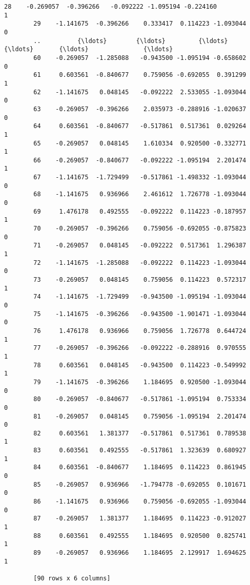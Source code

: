 \documentclass[11pt]{article}
\begin{document}
\begin{Verbatim}[commandchars=\\\{\}]
        28    -0.269057  -0.396266   -0.092222 -1.095194 -0.224160                 1
        29    -1.141675  -0.396266    0.333417  0.114223 -1.093044                 0
        ..          {\ldots}        {\ldots}         {\ldots}       {\ldots}       {\ldots}               {\ldots}
        60    -0.269057  -1.285088   -0.943500 -1.095194 -0.658602                 0
        61     0.603561  -0.840677    0.759056 -0.692055  0.391299                 1
        62    -1.141675   0.048145   -0.092222  2.533055 -1.093044                 0
        63    -0.269057  -0.396266    2.035973 -0.288916 -1.020637                 0
        64     0.603561  -0.840677   -0.517861  0.517361  0.029264                 1
        65    -0.269057   0.048145    1.610334  0.920500 -0.332771                 1
        66    -0.269057  -0.840677   -0.092222 -1.095194  2.201474                 1
        67    -1.141675  -1.729499   -0.517861 -1.498332 -1.093044                 0
        68    -1.141675   0.936966    2.461612  1.726778 -1.093044                 0
        69     1.476178   0.492555   -0.092222  0.114223 -0.187957                 1
        70    -0.269057  -0.396266    0.759056 -0.692055 -0.875823                 0
        71    -0.269057   0.048145   -0.092222  0.517361  1.296387                 1
        72    -1.141675  -1.285088   -0.092222  0.114223 -1.093044                 0
        73    -0.269057   0.048145    0.759056  0.114223  0.572317                 1
        74    -1.141675  -1.729499   -0.943500 -1.095194 -1.093044                 0
        75    -1.141675  -0.396266   -0.943500 -1.901471 -1.093044                 0
        76     1.476178   0.936966    0.759056  1.726778  0.644724                 1
        77    -0.269057  -0.396266   -0.092222 -0.288916  0.970555                 1
        78     0.603561   0.048145   -0.943500  0.114223 -0.549992                 1
        79    -1.141675  -0.396266    1.184695  0.920500 -1.093044                 0
        80    -0.269057  -0.840677   -0.517861 -1.095194  0.753334                 0
        81    -0.269057   0.048145    0.759056 -1.095194  2.201474                 0
        82     0.603561   1.381377   -0.517861  0.517361  0.789538                 1
        83     0.603561   0.492555   -0.517861  1.323639  0.680927                 1
        84     0.603561  -0.840677    1.184695  0.114223  0.861945                 0
        85    -0.269057   0.936966   -1.794778 -0.692055  0.101671                 0
        86    -1.141675   0.936966    0.759056 -0.692055 -1.093044                 0
        87    -0.269057   1.381377    1.184695  0.114223 -0.912027                 1
        88     0.603561   0.492555    1.184695  0.920500  0.825741                 1
        89    -0.269057   0.936966    1.184695  2.129917  1.694625                 1
        
        [90 rows x 6 columns]
\end{Verbatim}
            
\end{document}
